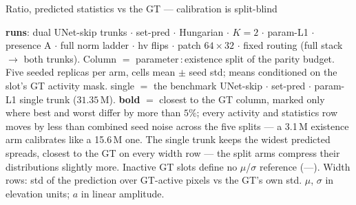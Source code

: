 \begin{frame}{Ratio, predicted statistics vs the GT --- calibration is split-blind}
  \parbox{0.82\textwidth}{\tiny\color{soft} \textbf{runs}: dual UNet-skip trunks $\cdot$ set-pred $\cdot$ Hungarian $\cdot$ $K{=}2$ $\cdot$ param-L1 $\cdot$ presence A $\cdot$ full norm ladder $\cdot$ hv flips $\cdot$ patch $64{\times}32$ $\cdot$ fixed routing (full stack $\to$ both trunks). Column $=$ parameter\,:\,existence split of the parity budget. Five seeded replicas per arm, cells mean $\pm$ seed std; means conditioned on the slot's GT activity mask. single $=$ the benchmark UNet-skip $\cdot$ set-pred $\cdot$ param-L1 single trunk ($31.35$\,M). \textbf{bold} $=$ closest to the \textcolor{good}{GT} column, marked only where best and worst differ by more than $5\%$; every activity and statistics row moves by less than combined seed noise across the five splits --- a 3.1\,M existence arm calibrates like a 15.6\,M one. The single trunk keeps the widest predicted spreads, closest to the GT on every width row --- the split arms compress their distributions slightly more. Inactive GT slots define no $\mu$/$\sigma$ reference (---). Width rows: std of the prediction over GT-active pixels vs the GT's own std. $\mu$, $\sigma$ in elevation units; $a$ in linear amplitude.\par}
\end{frame}

